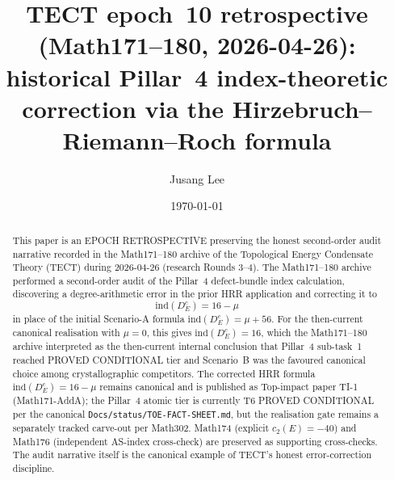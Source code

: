 



\title{TECT epoch~10 retrospective (Math171--180, 2026-04-26):
historical Pillar~4 index-theoretic correction via the
Hirzebruch--Riemann--Roch formula}

\author{Jusang Lee}

\date{\today}

\begin{abstract}
This paper is an EPOCH RETROSPECTIVE preserving the honest second-order
audit narrative recorded in the Math171--180 archive of the
Topological Energy Condensate Theory (TECT) during 2026-04-26
(research Rounds 3--4). The Math171--180 archive performed
a second-order audit of the Pillar~4 defect-bundle index calculation,
discovering a degree-arithmetic error in the prior HRR application
and correcting it to
\[
\mathrm{ind}(D_E^c) = 16 - \mu
\]
in place of the initial Scenario-A formula
$\mathrm{ind}(D_E^c) = \mu + 56$. For the then-current canonical
realisation with $\mu = 0$, this gives $\mathrm{ind}(D_E^c) = 16$,
which the Math171--180 archive interpreted as the then-current
internal conclusion that Pillar~4 sub-task~1 reached PROVED
CONDITIONAL tier and Scenario~B was the favoured canonical choice
among crystallographic competitors. The corrected HRR formula
$\mathrm{ind}(D_E^c) = 16 - \mu$ remains canonical and is published
as Top-impact paper TI-1 (Math171-AddA); the Pillar~4 atomic tier
is currently T6 PROVED CONDITIONAL per the canonical
\texttt{Docs/status/TOE-FACT-SHEET.md}, but the realisation gate
remains a separately tracked carve-out per Math302. Math174 (explicit
$c_2(E) = -40$) and Math176 (independent AS-index cross-check) are
preserved as supporting cross-checks. The audit narrative itself is
the canonical example of TECT's honest error-correction discipline.
\end{abstract}

